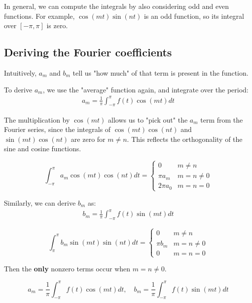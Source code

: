 In general, we can compute the integrals by also considering odd and even functions. For example, $\cos(mt) \sin(nt)$ is an odd function, so its integral over $[-\pi, \pi]$ is zero.

\subsection{Deriving the Fourier coefficients}
Intuitively, $a_m$ and $b_m$ tell us "how much" of that term is present in the function. 

To derive $a_m$, we use the "average" function again, and integrate over the period:
\begin{align*}
a_m = \frac{1}{\pi} \int_{-\pi}^{\pi} f(t) \cos(mt) dt
\end{align*}

The multiplication by $\cos(mt)$ allows us to "pick out" the $a_m$ term from the Fourier series, since the integrals of $\cos(mt) \cos(nt)$ and $\sin(mt) \cos(nt)$ are zero for $m \neq n$. This reflects the orthogonality of the sine and cosine functions. 

\begin{equation*}
\int_{-\pi}^{\pi} a_m \cos(mt) \cos(nt) dt = \begin{cases}
0 & m \neq n \\
\pi a_m & m = n \neq 0 \\
2\pi a_0 & m = n = 0
\end{cases}
\end{equation*}


Similarly, we can derive $b_m$ as:
\begin{align*}
b_m = \frac{1}{\pi} \int_{-\pi}^{\pi} f(t) \sin(mt) dt
\end{align*}

\begin{equation*}
\int_{\pi}^{\pi} b_m \sin(mt) \sin(nt) dt = \begin{cases}
0 & m \neq n \\
\pi b_m & m = n \neq 0 \\
0 & m = n = 0
\end{cases}
\end{equation*}

Then the \textbf{only} nonzero terms occur when $m = n \neq 0$.

\begin{equation*}
\boxed{
    a_m = \frac{1}{\pi} \int_{-\pi}^{\pi} f(t) \cos(mt) dt, \quad b_m = \frac{1}{\pi} \int_{-\pi}^{\pi} f(t) \sin(mt) dt
}
\end{equation*}

